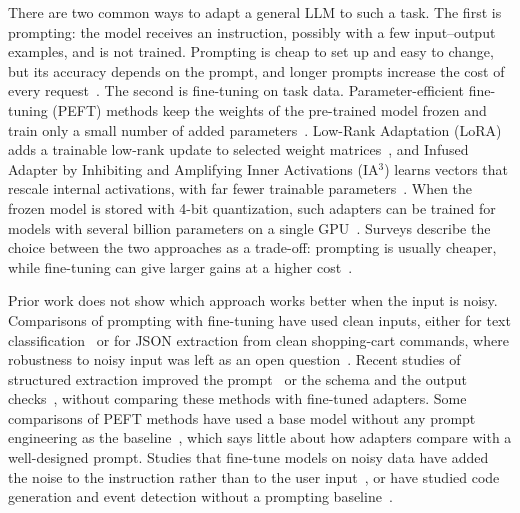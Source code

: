 \documentclass[journal,article,submit,pdftex,moreauthors]{Definitions/mdpi}
\begin{document}
There are two common ways to adapt a general LLM to such a task. The first is prompting: the model receives an instruction, possibly with a few input--output examples, and is not trained. Prompting is cheap to set up and easy to change, but its accuracy depends on the prompt, and longer prompts increase the cost of every request~\citep{ling2025domain}. The second is fine-tuning on task data. Parameter-efficient fine-tuning (PEFT) methods keep the weights of the pre-trained model frozen and train only a small number of added parameters~\citep{wang2025parameter}. Low-Rank Adaptation (LoRA) adds a trainable low-rank update to selected weight matrices~\citep{hu2022lora}, and Infused Adapter by Inhibiting and Amplifying Inner Activations (IA$^3$) learns vectors that rescale internal activations, with far fewer trainable parameters~\citep{liu2022fewshot}. When the frozen model is stored with 4-bit quantization, such adapters can be trained for models with several billion parameters on a single GPU~\citep{dettmers2023qlora}. Surveys describe the choice between the two approaches as a trade-off: prompting is usually cheaper, while fine-tuning can give larger gains at a higher cost~\citep{ling2025domain}.

Prior work does not show which approach works better when the input is noisy. Comparisons of prompting with fine-tuning have used clean inputs, either for text classification~\citep{wang2024adaptable} or for JSON extraction from clean shopping-cart commands, where robustness to noisy input was left as an open question~\citep{karlovic2026evaluating}. Recent studies of structured extraction improved the prompt~\citep{corso2026clinician} or the schema and the output checks~\citep{shrimal2025parse}, without comparing these methods with fine-tuned adapters. Some comparisons of PEFT methods have used a base model without any prompt engineering as the baseline~\citep{esmaeili2026empirical}, which says little about how adapters compare with a well-designed prompt. Studies that fine-tune models on noisy data have added the noise to the instruction rather than to the user input~\citep{yang2026towards}, or have studied code generation and event detection without a prompting baseline~\citep{liu2026improving,sijan2026beyond}.
\end{document}

